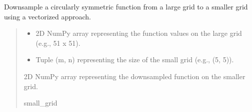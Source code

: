 \documentclass[letterpaper,10pt,english]{sphinxmanual}
\begin{document}
\begin{fulllineitems}
\label{\detokenize{source/stattools:stattools.downsample_circular_function}}
\pysigstartsignatures
\pysiglinewithargsret
{}
{\sphinxparamcomma {}}
{}
\pysigstopsignatures
\sphinxAtStartPar
Downsample a circularly symmetric function from a large grid to a smaller grid using a vectorized approach.
\begin{quote}\begin{description}
\begin{itemize}
\item {} 
\sphinxAtStartPar
{} \textendash{} 2D NumPy array representing the function values on the large grid (e.g., 51 x 51).

\item {} 
\sphinxAtStartPar
{} \textendash{} Tuple (m, n) representing the size of the small grid (e.g., (5, 5)).

\end{itemize}

\sphinxAtStartPar
2D NumPy array representing the downsampled function on the smaller grid.

\sphinxAtStartPar
small\_grid

\end{description}\end{quote}

\end{fulllineitems}

\end{document}
